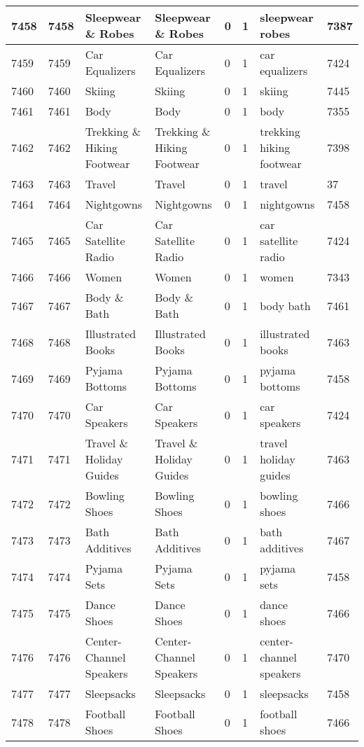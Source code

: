 \begin{longtable}{|l|l|l|l|l|l|l|l|}
7458 & 7458 & Sleepwear \& Robes & Sleepwear \& Robes & 0 & 1 & sleepwear robes & 7387 \\ \hline 
7459 & 7459 & Car Equalizers & Car Equalizers & 0 & 1 & car equalizers & 7424 \\ \hline 
7460 & 7460 & Skiing & Skiing & 0 & 1 & skiing & 7445 \\ \hline 
7461 & 7461 & Body & Body & 0 & 1 & body & 7355 \\ \hline 
7462 & 7462 & Trekking \& Hiking Footwear & Trekking \& Hiking Footwear & 0 & 1 & trekking hiking footwear & 7398 \\ \hline 
7463 & 7463 & Travel & Travel & 0 & 1 & travel & 37 \\ \hline 
7464 & 7464 & Nightgowns & Nightgowns & 0 & 1 & nightgowns & 7458 \\ \hline 
7465 & 7465 & Car Satellite Radio & Car Satellite Radio & 0 & 1 & car satellite radio & 7424 \\ \hline 
7466 & 7466 & Women & Women & 0 & 1 & women & 7343 \\ \hline 
7467 & 7467 & Body \& Bath & Body \& Bath & 0 & 1 & body bath & 7461 \\ \hline 
7468 & 7468 & Illustrated Books & Illustrated Books & 0 & 1 & illustrated books & 7463 \\ \hline 
7469 & 7469 & Pyjama Bottoms & Pyjama Bottoms & 0 & 1 & pyjama bottoms & 7458 \\ \hline 
7470 & 7470 & Car Speakers & Car Speakers & 0 & 1 & car speakers & 7424 \\ \hline 
7471 & 7471 & Travel \& Holiday Guides & Travel \& Holiday Guides & 0 & 1 & travel holiday guides & 7463 \\ \hline 
7472 & 7472 & Bowling Shoes & Bowling Shoes & 0 & 1 & bowling shoes & 7466 \\ \hline 
7473 & 7473 & Bath Additives & Bath Additives & 0 & 1 & bath additives & 7467 \\ \hline 
7474 & 7474 & Pyjama Sets & Pyjama Sets & 0 & 1 & pyjama sets & 7458 \\ \hline 
7475 & 7475 & Dance Shoes & Dance Shoes & 0 & 1 & dance shoes & 7466 \\ \hline 
7476 & 7476 & Center-Channel Speakers & Center-Channel Speakers & 0 & 1 & center-channel speakers & 7470 \\ \hline 
7477 & 7477 & Sleepsacks & Sleepsacks & 0 & 1 & sleepsacks & 7458 \\ \hline 
7478 & 7478 & Football Shoes & Football Shoes & 0 & 1 & football shoes & 7466 \\ \hline 

\end{longtable}
